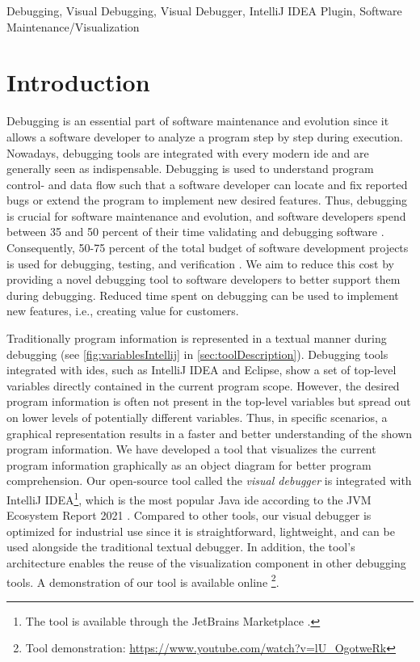 \documentclass[conference]{IEEEtran}
\newcommand{\intellij}{IntelliJ IDEA}
\begin{document}
\begin{IEEEkeywords}
Debugging, Visual Debugging, Visual Debugger, IntelliJ IDEA Plugin, Software Maintenance/Visualization
\end{IEEEkeywords}

\section{Introduction}
Debugging is an essential part of software maintenance and evolution since it allows a software developer to analyze a program step by step during execution.
Nowadays, debugging tools are integrated with every modern \gls*{ide} and are generally seen as indispensable.
Debugging is used to understand program control- and data flow such that a software developer can locate and fix reported bugs or extend the program to implement new desired features.
Thus, debugging is crucial for software maintenance and evolution, and software developers spend between 35 and 50 percent of their time validating and debugging software \cite{odellDebuggingMindsetUnderstanding2017}.
Consequently, 50-75 percent of the total budget of software development projects is used for debugging, testing, and verification \cite{odellDebuggingMindsetUnderstanding2017}.
We aim to reduce this cost by providing a novel debugging tool to software developers to better support them during debugging.
Reduced time spent on debugging can be used to implement new features, i.e., creating value for customers.

Traditionally program information is represented in a textual manner during debugging (see \autoref{fig:variablesIntellij} in \autoref{sec:toolDescription}).
Debugging tools integrated with \glspl*{ide}, such as \intellij{} and Eclipse, show a set of top-level variables directly contained in the current program scope.
However, the desired program information is often not present in the top-level variables but spread out on lower levels of potentially different variables.
Thus, in specific scenarios, a graphical representation results in a faster and better understanding of the shown program information.
We have developed a tool that visualizes the current program information graphically as an object diagram for better program comprehension.
Our open-source tool called the \textit{visual debugger} is integrated with \intellij{}\footnote{The tool is available through the JetBrains Marketplace \cite{VisualDebuggerIntelliJ}.}, which is the most popular Java \gls*{ide} according to the JVM Ecosystem Report 2021 \cite{JVMEcosystemReport2021}.
Compared to other tools, our visual debugger is optimized for industrial use since it is straightforward, lightweight, and can be used alongside the traditional textual debugger.
In addition, the tool's architecture enables the reuse of the visualization component in other debugging tools.
A demonstration of our tool is available online \cite{ArtifactsICSME2022}\footnote{Tool demonstration: \url{https://www.youtube.com/watch?v=lU_OgotweRk}}.
\end{document}
